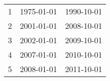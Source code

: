 % 
\begin{tabular}{ccc}
  \hline
  \hline
1 & 1975-01-01 & 1990-10-01 \\ 
  2 & 2001-01-01 & 2008-10-01 \\ 
  3 & 2002-01-01 & 2009-10-01 \\ 
  4 & 2007-01-01 & 2010-10-01 \\ 
  5 & 2008-01-01 & 2011-10-01 \\ 
   \hline
\end{tabular}
